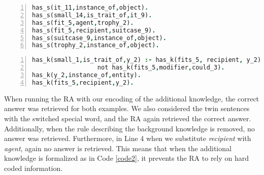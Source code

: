 \begin{lstlisting}[language = Prolog,  caption={Knowledge from Figure 4.1},label=code1, numbers=left,
numberstyle=\tiny] 
has_s(it_11,instance_of,object).
has_s(small_14,is_trait_of,it_9).
has_s(fit_5,agent,trophy_2).
has_s(fit_5,recipient,suitcase_9).
has_s(suitcase_9,instance_of,object).
has_s(trophy_2,instance_of,object).
\end{lstlisting}

\begin{lstlisting}[language = Prolog,  caption={Additional knowledge},label=code2,numbers=left,
numberstyle=\tiny]
has_k(small_1,is_trait_of,y_2) :- has_k(fits_5, recipient, y_2), 
				  not has_k(fits_5,modifier,could_3).
has_k(y_2,instance_of,entity).
has_k(fits_5,recipient,y_2).
\end{lstlisting}

When running the RA with our encoding of the additional knowledge, the correct answer was retrieved for both examples. We also considered the twin sentences with the switched special word, and the RA again retrieved the correct answer. Additionally, when the rule describing the background knowledge is removed, no answer was retrieved. Furthermore, in Line 4 when we substitute \textit{recipient} with \textit{agent}, again no answer is retrieved. This means that when the additional knowledge is formalized as in Code \ref{code2}, it prevents the RA to rely on hard coded information.









